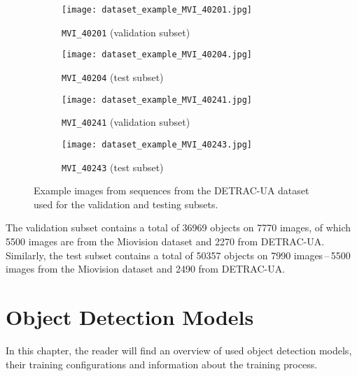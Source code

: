 \begin{figure}
    \centering
    \begin{subfigure}[b]{0.475\textwidth}
        \texttt{[image: dataset\_example\_MVI\_40201.jpg]}
        \caption{\texttt{MVI\_40201} (validation subset)}
    \end{subfigure}
    \begin{subfigure}[b]{0.475\textwidth}
        \texttt{[image: dataset\_example\_MVI\_40204.jpg]}
        \caption{\texttt{MVI\_40204} (test subset)}
    \end{subfigure}
    \begin{subfigure}[b]{0.475\textwidth}
        \texttt{[image: dataset\_example\_MVI\_40241.jpg]}
        \caption{\texttt{MVI\_40241} (validation subset)}
    \end{subfigure}
    \begin{subfigure}[b]{0.475\textwidth}
        \texttt{[image: dataset\_example\_MVI\_40243.jpg]}
        \caption{\texttt{MVI\_40243} (test subset)}
    \end{subfigure}
    \caption{Example images from sequences from the DETRAC-UA dataset used for
    the validation and testing subsets.}
    \label{TestValExamples}
\end{figure}

The validation subset contains a total of \num{36969} objects on \num{7770}
images, of which \num{5500} images are from the Miovision dataset and \num{2270}
from DETRAC-UA. Similarly, the test subset contains a total of \num{50357}
objects on \num{7990} images\,--\,\num{5500} images from the Miovision dataset and
\num{2490} from DETRAC-UA.




\chapter{Object Detection Models}





In this chapter, the reader will find an overview of used object detection
models, their training configurations and information about the training
process.


